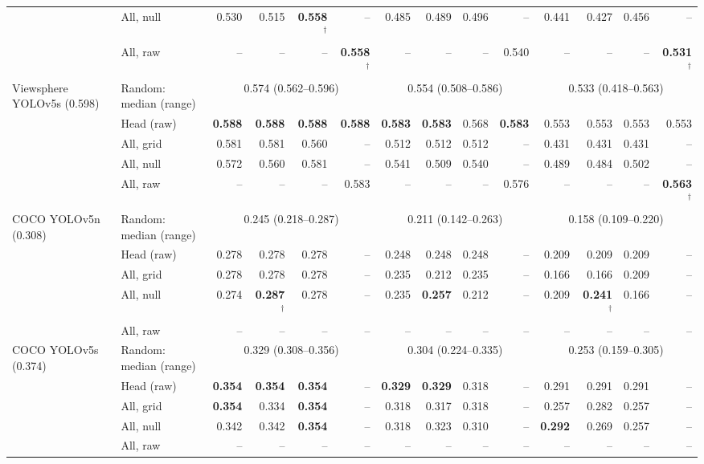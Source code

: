 \begin{tabular}{llrrrrrrrrrrrr}
 & All, null & 0.530 & 0.515 & \textbf{0.558$^\dagger$} & -- & 0.485 & 0.489 & 0.496 & -- & 0.441 & 0.427 & 0.456 & -- \\
 & All, raw & -- & -- & -- & \textbf{0.558$^\dagger$} & -- & -- & -- & 0.540 & -- & -- & -- & \textbf{0.531$^\dagger$} \\
\midrule
Viewsphere YOLOv5s (0.598) & Random: median (range) & \multicolumn{4}{c}{0.574 (0.562--0.596)} & \multicolumn{4}{c}{0.554 (0.508--0.586)} & \multicolumn{4}{c}{0.533 (0.418--0.563)} \\
 & Head (raw) & \textbf{0.588} & \textbf{0.588} & \textbf{0.588} & \textbf{0.588} & \textbf{0.583} & \textbf{0.583} & 0.568 & \textbf{0.583} & 0.553 & 0.553 & 0.553 & 0.553 \\
 & All, grid & 0.581 & 0.581 & 0.560 & -- & 0.512 & 0.512 & 0.512 & -- & 0.431 & 0.431 & 0.431 & -- \\
 & All, null & 0.572 & 0.560 & 0.581 & -- & 0.541 & 0.509 & 0.540 & -- & 0.489 & 0.484 & 0.502 & -- \\
 & All, raw & -- & -- & -- & 0.583 & -- & -- & -- & 0.576 & -- & -- & -- & \textbf{0.563$^\dagger$} \\
\midrule
COCO YOLOv5n (0.308) & Random: median (range) & \multicolumn{4}{c}{0.245 (0.218--0.287)} & \multicolumn{4}{c}{0.211 (0.142--0.263)} & \multicolumn{4}{c}{0.158 (0.109--0.220)} \\
 & Head (raw) & 0.278 & 0.278 & 0.278 & -- & 0.248 & 0.248 & 0.248 & -- & 0.209 & 0.209 & 0.209 & -- \\
 & All, grid & 0.278 & 0.278 & 0.278 & -- & 0.235 & 0.212 & 0.235 & -- & 0.166 & 0.166 & 0.209 & -- \\
 & All, null & 0.274 & \textbf{0.287$^\dagger$} & 0.278 & -- & 0.235 & \textbf{0.257} & 0.212 & -- & 0.209 & \textbf{0.241$^\dagger$} & 0.166 & -- \\
 & All, raw & -- & -- & -- & -- & -- & -- & -- & -- & -- & -- & -- & -- \\
\midrule
COCO YOLOv5s (0.374) & Random: median (range) & \multicolumn{4}{c}{0.329 (0.308--0.356)} & \multicolumn{4}{c}{0.304 (0.224--0.335)} & \multicolumn{4}{c}{0.253 (0.159--0.305)} \\
 & Head (raw) & \textbf{0.354} & \textbf{0.354} & \textbf{0.354} & -- & \textbf{0.329} & \textbf{0.329} & 0.318 & -- & 0.291 & 0.291 & 0.291 & -- \\
 & All, grid & \textbf{0.354} & 0.334 & \textbf{0.354} & -- & 0.318 & 0.317 & 0.318 & -- & 0.257 & 0.282 & 0.257 & -- \\
 & All, null & 0.342 & 0.342 & \textbf{0.354} & -- & 0.318 & 0.323 & 0.310 & -- & \textbf{0.292} & 0.269 & 0.257 & -- \\
 & All, raw & -- & -- & -- & -- & -- & -- & -- & -- & -- & -- & -- & -- \\
\bottomrule
\end{tabular}
